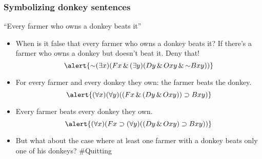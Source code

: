 \begin{frame}
    \frametitle{Symbolizing donkey sentences}

``Every farmer who owns a donkey beats it''\pauses

\begin{itemize}[<+->]
\item When is it false that every farmer who owns a donkey beats it? \pauses
If there's a farmer who owns a donkey but doesn't beat it. Deny that! \pauses
\[
\alert{\lnot\qt{\exists}{x}(F\qv{x} \land \qt{\exists}{y}(D\qv{y} \land O\qr{x}{y} \land \lnot B\qr{x}{y}))}
\]
\item For every farmer and every donkey they own: the farmer beats the donkey.
\[
\alert{\qt{\forall}{x}\qt{\forall}{y}((F\qv{x} \land (D\qv{y} \eand O\qr{x}{y})) \to B\qr{x}{y})}
\]
\item Every farmer beats every donkey they own.
\[
\alert{\qt{\forall}{x}(F\qv{x} \to \qt{\forall}{y}((D\qv{y} \land O\qr{x}{y}) \to B\qr{x}{y}))}
\]
\item But what about the case where at least one farmer with a donkey beats only one of his donkeys? $\#$Quitting
\end{itemize}
\end{frame}
